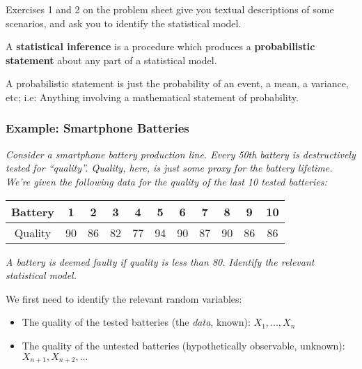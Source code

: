 \documentclass[a4paper]{article}
\begin{document}
            \begin{relq}
                Exercises 1 and 2 on the problem sheet give you textual
                descriptions of some scenarios, and ask you to identify the
                statistical model.
            \end{relq}

            \begin{definition}
                A \textbf{statistical inference} is a procedure which produces
                a \textbf{probabilistic statement} about any part of a
                statistical model.

                A probabilistic statement is just the probability of an event,
                a mean, a variance, etc; i.e: Anything involving a mathematical
                statement of probability.
            \end{definition}

            \subsubsection{Example: Smartphone Batteries}
                \textit{Consider a smartphone battery production line. Every
                50th battery is destructively tested for ``quality''. Quality,
                here, is just some proxy for the battery lifetime. We're given
                the following data for the quality of the last 10 tested
                batteries:}

                \begin{center}
                    \begin{tabular}{c | c c c c c c c c c c}
                        Battery & 1 & 2 & 3 & 4 & 5 & 6 & 7 & 8 & 9 & 10 \\
                        \hline
                        Quality & 90 & 86 & 82 & 77 & 94 & 90 & 87 & 90 & 86 &
                            86
                    \end{tabular}
                \end{center}

                \textit{A battery is deemed faulty if quality is less than 80.
                Identify the relevant statistical model.}

                We first need to identify the relevant random variables:

                \begin{itemize}
                    \item The quality of the tested batteries (the
                        \textit{data}, known): $X_1, ..., X_n$
                    \item The quality of the untested batteries (hypothetically
                        observable, unknown): $X_{n+1}, X_{n+2}, ...$
                \end{itemize}
\end{document}
